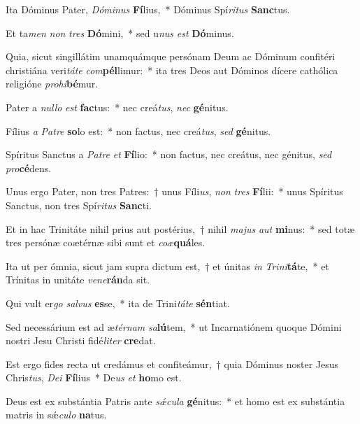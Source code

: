 \item Ita Dóminus Pater, \textit{Dó}\textit{mi}\textit{nus} \textbf{Fí}lius,~* Dóminus Spí\textit{ri}\textit{tus} \textbf{Sanc}tus.
\item Et ta\textit{men} \textit{non} \textit{tres} \textbf{Dó}mini,~* sed u\textit{nus} \textit{est} \textbf{Dó}minus.
\item Quia, sicut singillátim unamquámque persónam Deum ac Dóminum confitéri christiána veri\textit{tá}\textit{te} \textit{com}\textbf{pél}limur:~* ita tres Deos aut Dóminos dícere cathólica religióne \textit{pro}\textit{hi}\textbf{bé}mur.
\item Pater a \textit{nul}\textit{lo} \textit{est} \textbf{fac}tus:~* nec creá\textit{tus}, \textit{nec} \textbf{gé}nitus.
\item Fílius \textit{a} \textit{Pa}\textit{tre} \textbf{so}lo est:~* non factus, nec creá\textit{tus}, \textit{sed} \textbf{gé}nitus.
\item Spíritus Sanctus a \textit{Pa}\textit{tre} \textit{et} \textbf{Fí}lio:~* non factus, nec creátus, nec génitus, \textit{sed} \textit{pro}\textbf{cé}dens.
\item Unus ergo Pater, non tres Patres:~† unus Fíli\textit{us}, \textit{non} \textit{tres} \textbf{Fí}lii:~* unus Spíritus Sanctus, non tres Spí\textit{ri}\textit{tus} \textbf{Sanc}ti.
\item Et in hac Trinitáte nihil prius aut postérius,~† nihil \textit{ma}\textit{jus} \textit{aut} \textbf{mi}nus:~* sed totæ tres persónæ coætérnæ sibi sunt et \textit{co}\textit{æ}\textbf{quá}les.
\item Ita ut per ómnia, sicut jam supra dictum est,~† et únitas \textit{in} \textit{Tri}\textit{ni}\textbf{tá}te,~* et Trínitas in unitáte \textit{ve}\textit{ne}\textbf{rán}da sit.
\item Qui vult er\textit{go} \textit{sal}\textit{vus} \textbf{es}se,~* ita de Trini\textit{tá}\textit{te} \textbf{sén}tiat.
\item Sed necessárium est ad æ\textit{tér}\textit{nam} \textit{sa}\textbf{lú}tem,~* ut Incarnatiónem quoque Dómini nostri Jesu Christi fidé\textit{li}\textit{ter} \textbf{cre}dat.
\item Est ergo fides recta ut credámus et confiteámur,~† quia Dóminus noster Jesus Chris\textit{tus}, \textit{De}\textit{i} \textbf{Fí}lius~* De\textit{us} \textit{et} \textbf{ho}mo est.
\item Deus est ex substántia Patris ante \textit{sǽ}\textit{cu}\textit{la} \textbf{gé}nitus:~* et homo est ex substántia matris in sǽ\textit{cu}\textit{lo} \textbf{na}tus.

